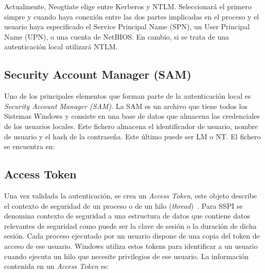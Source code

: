 Actualmente, Neogtiate elige entre Kerberos y NTLM. Seleccionará el primero simpre y cuando haya conexión entre las dos partes implicadas en el proceso y el usuario haya especificado el Service Principal Name (SPN), un User Principal Name (UPN), o una cuenta de NetBIOS. En cambio, si se trata de una autenticación local utilizará NTLM.

\subsection{Security Account Manager (SAM)}

Uno de los principales elementos que forman parte de la autenticación local es {\it Security Account Manager (SAM)}. La SAM es un archivo que tiene todos los Sistemas Windows y consiste en una base de datos que almacena las credenciales de los usuarios locales. Este fichero almacena el identificador de usuario, nombre de usuario y el hash de la contraseña. Este último puede ser LM o NT. El fichero se encuentra en:

\begin{listing}[style=consola, numbers=none]
\end{listing}

\subsection{Access Token}

Una vez validada la autenticación, se crea un {\it Access Token}, este objeto describe el contexto de seguridad de un proceso o de un hilo ({\it thread})~\cite{Capitulo2:Access-Token}. Para SSPI se denomina contexto de seguridad a una estructura de datos que contiene datos relevantes de seguridad como puede ser la clave de sesión o la duración de dicha sesión. Cada proceso ejecutado por un usuario dispone de una copia del token de acceso de ese usuario. Windows utiliza estos tokens para identificar a un usuario cuando ejecuta un hilo que necesite privilegios de ese usuario. La información contenida en un {\it Access Token} es:

